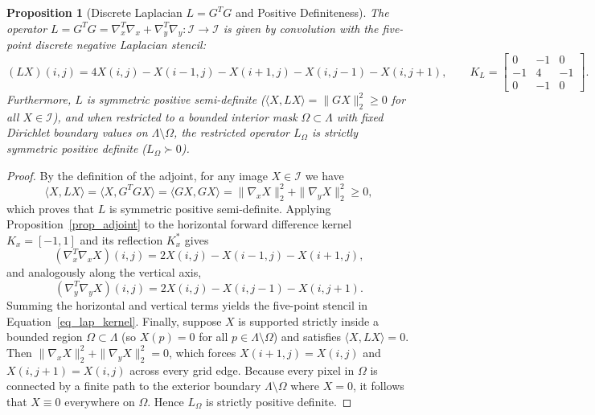 \documentclass{amsart}
\newtheorem{proposition}[theorem]{Proposition}
\begin{document}
\begin{proposition}[Discrete Laplacian $L = G^T G$ and Positive Definiteness]\label{prop_laplacian}
    The operator $L = G^T G = \nabla_x^T \nabla_x + \nabla_y^T \nabla_y : \mathcal{I} \to \mathcal{I}$ is given by convolution with the five-point discrete negative Laplacian stencil:
    \begin{equation}\label{eq_lap_kernel}
        (L X)(i, j) = 4 X(i, j) - X(i-1, j) - X(i+1, j) - X(i, j-1) - X(i, j+1), \qquad
        K_L = \begin{bmatrix} 0 & -1 & 0 \\ -1 & 4 & -1 \\ 0 & -1 & 0 \end{bmatrix}.
    \end{equation}
    Furthermore, $L$ is symmetric positive semi-definite ($\langle X, L X \rangle = \|G X\|_2^2 \geq 0$ for all $X \in \mathcal{I}$), and when restricted to a bounded interior mask $\Omega \subset \Lambda$ with fixed Dirichlet boundary values on $\Lambda \setminus \Omega$, the restricted operator $L_\Omega$ is strictly symmetric positive definite ($L_\Omega \succ 0$).
\end{proposition}
\begin{proof}
    By the definition of the adjoint, for any image $X \in \mathcal{I}$ we have
    \[
        \langle X, L X \rangle = \langle X, G^T G X \rangle = \langle G X, G X \rangle = \|\nabla_x X\|_2^2 + \|\nabla_y X\|_2^2 \geq 0,
    \]
    which proves that $L$ is symmetric positive semi-definite. Applying Proposition~\ref{prop_adjoint} to the horizontal forward difference kernel $K_x = [-1, 1]$ and its reflection $K_x^*$ gives
    \[
        (\nabla_x^T \nabla_x X)(i,j) = 2 X(i,j) - X(i-1,j) - X(i+1,j),
    \]
    and analogously along the vertical axis,
    \[
        (\nabla_y^T \nabla_y X)(i,j) = 2 X(i,j) - X(i,j-1) - X(i,j+1).
    \]
    Summing the horizontal and vertical terms yields the five-point stencil in Equation~\eqref{eq_lap_kernel}. Finally, suppose $X$ is supported strictly inside a bounded region $\Omega \subset \Lambda$ (so $X(p) = 0$ for all $p \in \Lambda \setminus \Omega$) and satisfies $\langle X, L X \rangle = 0$. Then $\|\nabla_x X\|_2^2 + \|\nabla_y X\|_2^2 = 0$, which forces $X(i+1,j) = X(i,j)$ and $X(i,j+1) = X(i,j)$ across every grid edge. Because every pixel in $\Omega$ is connected by a finite path to the exterior boundary $\Lambda \setminus \Omega$ where $X = 0$, it follows that $X \equiv 0$ everywhere on $\Omega$. Hence $L_\Omega$ is strictly positive definite.
\end{proof}
\end{document}
